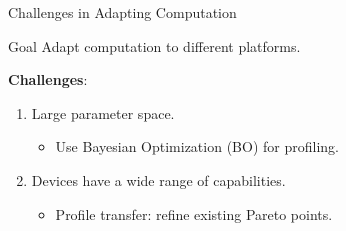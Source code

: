 \begin{frame}{Challenges in Adapting Computation}
  \begin{block}{Goal}
    Adapt computation to different platforms.
  \end{block}

  \textbf{Challenges}:

  \begin{enumerate}
  \item Large parameter space.
    \begin{itemize}
    \item Use Bayesian Optimization (BO) for profiling.
    \end{itemize}
  \item Devices have a wide range of capabilities.
    \begin{itemize}
    \item Profile transfer: refine existing Pareto points.
    \end{itemize}
  \end{enumerate}
\end{frame}

